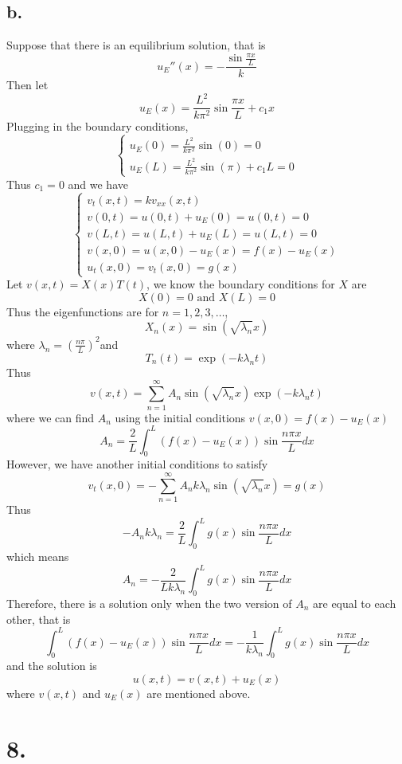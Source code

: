 \documentclass[11pt]{article}
\theoremstyle{mystyle}
\theoremstyle{definition}
\begin{document}
\subsection*{b.}
Suppose that there is an equilibrium solution, that is 
\[
  u_E''(x) = - \displaystyle\frac{\sin \displaystyle\frac{\pi x}{L}}{k}
\]
Then let 
\[
  u_E(x) = \displaystyle\frac{L^2}{k\pi^2} \sin \displaystyle\frac{\pi x}{L} + c_1x
\]
Plugging in the boundary conditions, 
\[
  \begin{cases}
    u_E(0) = \displaystyle\frac{L^2}{k\pi^2} \sin(0) = 0 \\
    u_E(L) = \displaystyle\frac{L^2}{k\pi^2}\sin(\pi) + c_1 L = 0
  \end{cases}
\]
Thus $c_1 = 0$ and we have 
\[
  \begin{cases}  
    v_t(x,t) = kv_{xx}(x,t) \\
    v(0,t) = u(0,t) + u_E(0) = u(0,t) = 0 \\
    v(L,t) = u(L,t) + u_E(L) = u(L,t) = 0 \\
    v(x,0) = u(x,0) - u_E(x) = f(x) - u_E(x) \\
    u_t(x,0) = v_t(x,0) = g(x)
  \end{cases}
\]
Let $v(x,t) = X(x) T(t)$, we know the boundary conditions for $X$ are 
\[
  X(0) = 0 \text{ and } X(L) = 0
\]
Thus the eigenfunctions are for $n=1,2,3, \hdots$, 
\[
  X_n(x) = \sin(\sqrt{\lambda_n}x)
\]
where $\lambda_n = \left( \displaystyle\frac{n\pi}{L}\right)^2$and 
\[
  T_n(t) = \exp(-k \lambda_n t)
\]
Thus 
\[
  v(x,t) = \sum_{n=1}^\infty A_n \sin(\sqrt{\lambda_n} x) \exp(-k\lambda_n t)
\]
where we can find $A_n$ using the initial conditions $v(x,0) = f(x) - u_E(x)$
\[
  A_n = \displaystyle\frac{2}{L} \int_0^L (f(x) - u_E(x)) \sin \displaystyle\frac{n\pi x}{L} dx
\]
However, we have another initial conditions to satisfy
\[
  v_t(x,0) = - \sum_{n=1}^\infty A_n k \lambda_n \sin(\sqrt{\lambda_n}x) = g(x)
\]
Thus 
\[
  -A_n k\lambda_n =  \displaystyle\frac{2}{L} \int_0^L g(x) \sin \displaystyle\frac{n\pi x}{L} dx
\]
which means
\[
  A_n = -\displaystyle\frac{2}{Lk \lambda_n} \int_0^L g(x) \sin\displaystyle\frac{n\pi x}{L} dx
\]
Therefore, there is a solution only when the two version of $A_n$ are equal to each other, that is 
\[
  \int_0^L (f(x) - u_E(x)) \sin \displaystyle\frac{n\pi x}{L} dx = -\displaystyle\frac{1}{k \lambda_n} \int_0^L g(x) \sin \displaystyle\frac{n\pi x}{L} dx
\]
and the solution is 
\[
  u(x,t) = v(x,t) + u_E(x)
\]
where $v(x,t)$ and $u_E(x)$ are mentioned above. 
\newpage
\section*{8.}
\end{document}
